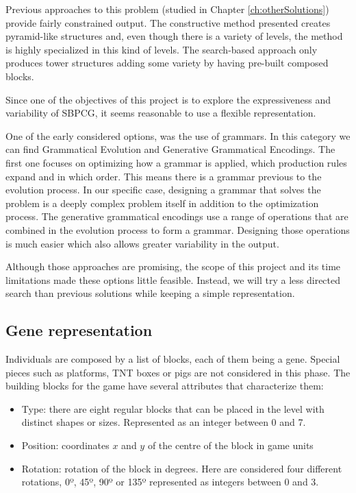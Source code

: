 Previous approaches to this problem (studied in Chapter \ref{ch:otherSolutions}) provide fairly constrained output. The constructive method presented creates pyramid-like structures and, even though there is a variety of levels, the method is highly specialized in this kind of levels. The search-based approach only produces tower structures adding some variety by having pre-built composed blocks. 

Since one of the objectives of this project is to explore the expressiveness and variability of \acs{SBPCG}, it seems reasonable to use a flexible representation. 

One of the early considered options, was the use of grammars. In this category we can find Grammatical Evolution\cite{lourencco2015sge} and Generative Grammatical Encodings\cite{hornby2001advantages}. The first one focuses on optimizing how a grammar is applied, which production rules expand and in which order. This means there is a grammar previous to the evolution process. In our specific case, designing a grammar that solves the problem is a deeply complex problem itself in addition to the optimization process. The generative grammatical encodings use a range of operations that are combined in the evolution process to form a grammar. Designing those operations is much easier which also allows greater variability in the output. 

Although those approaches are promising, the scope of this project and its time limitations made these options little feasible. Instead, we will try a less directed search than previous solutions while keeping a simple representation.
\subsection{Gene representation}
Individuals are composed by a list of blocks, each of them being a gene. Special pieces such as platforms, TNT boxes or pigs are not considered in this phase. The building blocks for the game have several attributes that characterize them: 

\begin{itemize}
	\item Type: there are eight regular blocks that can be placed in the level with distinct shapes or sizes. Represented as an integer between $0$ and 7.
	\item Position: coordinates $x$ and $y$ of the centre of the block in game units 
	\item Rotation: rotation of the block in degrees. Here are considered four different rotations, 0º, 45º, 90º or 135º represented as integers between $0$ and 3.
\end{itemize}

